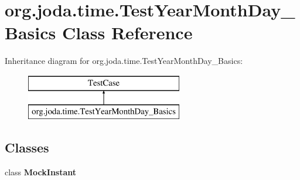 \hypertarget{classorg_1_1joda_1_1time_1_1_test_year_month_day___basics}{\section{org.\-joda.\-time.\-Test\-Year\-Month\-Day\-\_\-\-Basics Class Reference}
\label{classorg_1_1joda_1_1time_1_1_test_year_month_day___basics}
}
Inheritance diagram for org.\-joda.\-time.\-Test\-Year\-Month\-Day\-\_\-\-Basics\-:\begin{figure}[H]
\begin{center}
\leavevmode
\includegraphics[height=2.000000cm]{classorg_1_1joda_1_1time_1_1_test_year_month_day___basics}
\end{center}
\end{figure}
\subsection*{Classes}
\begin{DoxyCompactItemize}
\item 
class {\bfseries Mock\-Instant}
\end{DoxyCompactItemize}
